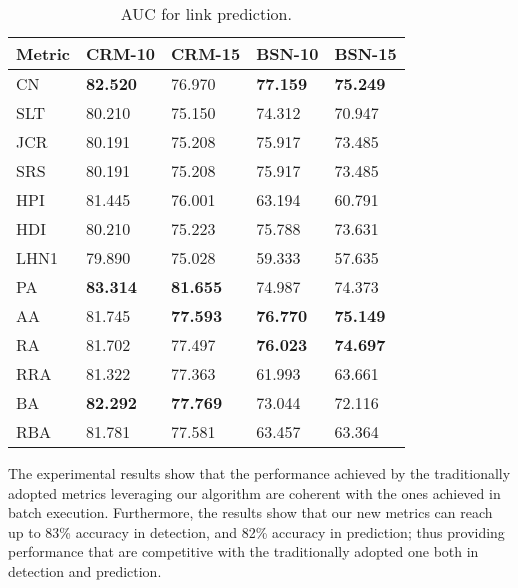 %
\begin{table}[h]
	\centering
	\begin{tabular}{l l l l l}
	\toprule
	\textbf{Metric} & \textbf{CRM-10} & \textbf{CRM-15} & \textbf{BSN-10} & \textbf{BSN-15}\\
	\midrule
		CN   & \textbf{82.520} & 76.970 		 & \textbf{77.159} & \textbf{75.249} \\
		SLT  & 80.210 		   & 75.150 		 & 74.312 		   & 70.947 \\
		JCR  & 80.191 		   & 75.208 		 & 75.917 		   & 73.485 \\
		SRS  & 80.191 		   & 75.208 		 & 75.917 		   & 73.485 \\
		HPI  & 81.445 		   & 76.001 		 & 63.194 		   & 60.791 \\
		HDI  & 80.210 		   & 75.223 		 & 75.788 		   & 73.631 \\
		LHN1 & 79.890 		   & 75.028 		 & 59.333 		   & 57.635 \\
		PA   & \textbf{83.314} & \textbf{81.655} & 74.987 		   & 74.373 \\
		AA   & 81.745 		   & \textbf{77.593} & \textbf{76.770} & \textbf{75.149} \\
		RA   & 81.702 		   & 77.497 		 & \textbf{76.023} & \textbf{74.697} \\
		RRA  & 81.322 		   & 77.363 		 & 61.993 		   & 63.661 \\
		BA   & \textbf{82.292} & \textbf{77.769} & 73.044 		   & 72.116 \\
		RBA  & 81.781 		   & 77.581 		 & 63.457 		   & 63.364 \\
	\bottomrule
	\end{tabular}
	\caption{AUC for link prediction.}
	\label{tab:auc-prediction}
\end{table}
%
The experimental results show that the performance achieved by the traditionally adopted metrics leveraging our algorithm are coherent with the ones achieved in batch execution\cite{Lu2011}.
%
Furthermore, the results show that our new metrics can reach up to 83\% accuracy in detection, and 82\% accuracy in prediction; thus providing performance that are competitive with the traditionally adopted one both in detection and prediction.



%

